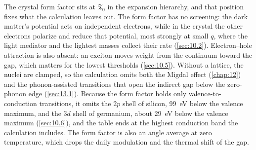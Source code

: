 The crystal form factor sits at $\mathfrak{T}_0$ in the expansion hierarchy, and that position fixes what the calculation leaves out. The form factor has no screening: the dark matter's potential acts on independent electrons, while in the crystal the other electrons polarize and reduce that potential, most strongly at small $q$, where the light mediator and the lightest masses collect their rate (\cref{sec:10.2}). Electron--hole attraction is also absent: an exciton moves weight from the continuum toward the gap, which matters for the lowest thresholds (\cref{sec:10.5}). Without a lattice, the nuclei are clamped, so the calculation omits both the Migdal effect (\cref{chap:12}) and the phonon-assisted transitions that open the indirect gap below the zero-phonon edge (\cref{sec:13.1}). Because the form factor holds only valence-to-conduction transitions, it omits the $2p$ shell of silicon, \SI{99}{eV} below the valence maximum, and the $3d$ shell of germanium, about \SI{29}{eV} below the valence maximum (\cref{sec:10.6}), and the table ends at the highest conduction band the calculation includes. The form factor is also an angle average at zero temperature, which drops the daily modulation and the thermal shift of the gap.
